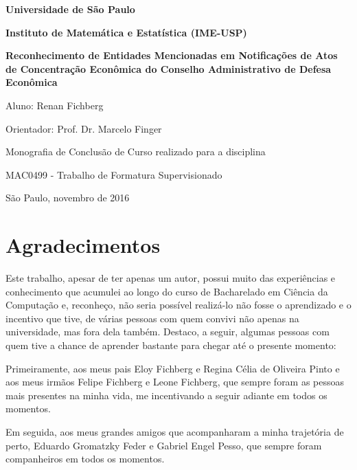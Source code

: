 \documentclass[11pt]{report}
\begin{document}
\begin{center}
  \thispagestyle{empty}
  {\LARGE \textbf{Universidade de São Paulo}}
  \vspace*{10px}

  {\LARGE \textbf{Instituto de Matemática e Estatística (IME-USP)}}
  \vspace*{150px}

  {\Large \textbf{Reconhecimento de Entidades Mencionadas em Notificações de Atos de Concentração Econômica do Conselho Administrativo de Defesa Econômica}}
  \vspace*{100px}

  {\Large Aluno: Renan Fichberg}

  \vspace*{1px}
  {\Large Orientador: Prof. Dr. Marcelo Finger}

  \vspace*{150px}
  {\large Monografia de Conclusão de Curso realizado para a disciplina}

  \vspace*{1px}
  {\large MAC0499 - Trabalho de Formatura Supervisionado}

  \vspace*{100px}
  {\large São Paulo, novembro de 2016}
\end{center}

\pagebreak
\thispagestyle{empty}
\chapter*{Agradecimentos}

\indent\indent Este trabalho, apesar de ter apenas um autor, possui muito das experiências e conhecimento que acumulei ao longo
do curso de Bacharelado em Ciência da Computação e, reconheço, não seria possível realizá-lo não fosse o aprendizado e o incentivo que tive, de várias
pessoas com quem convivi não apenas na universidade, mas fora dela também. Destaco, a seguir, algumas pessoas com quem tive a chance de aprender
bastante para chegar até o presente momento:

Primeiramente, aos meus pais Eloy Fichberg e Regina Célia de Oliveira Pinto e aos meus irmãos Felipe Fichberg e Leone Fichberg, que sempre foram
as pessoas mais presentes na minha vida, me incentivando a seguir adiante em todos os momentos.

Em seguida, aos meus grandes amigos que acompanharam a minha trajetória de perto, Eduardo Gromatzky Feder e Gabriel Engel Pesso, que sempre foram companheiros
em todos os momentos.
\end{document}
